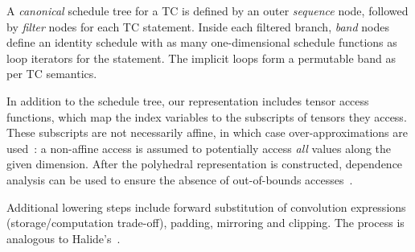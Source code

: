A \emph{canonical} schedule tree for a TC is defined by an outer
\emph{sequence} node, followed by \emph{filter} nodes for each TC statement.
Inside each filtered branch, \emph{band} nodes define an identity schedule with
as many one-dimensional schedule functions as loop iterators for the statement.
The implicit loops form a permutable band as per TC semantics.

In addition to the schedule tree, our representation includes tensor access
functions, which map the index variables to the subscripts of tensors they
access. These subscripts are not necessarily affine, in which case
over-approximations are used~\cite{Benabderrahmane2010Polyhedral}: a non-affine
access is assumed to potentially access \emph{all} values along the given
dimension.  After the polyhedral representation is constructed, dependence
analysis can be used to ensure the absence of out-of-bounds
accesses~\cite{Pugh1994Static}.

%

Additional lowering steps include forward substitution of convolution
expressions (storage/computation trade-off), padding, mirroring and clipping.
The process is analogous to Halide's~\cite{Halide}.


